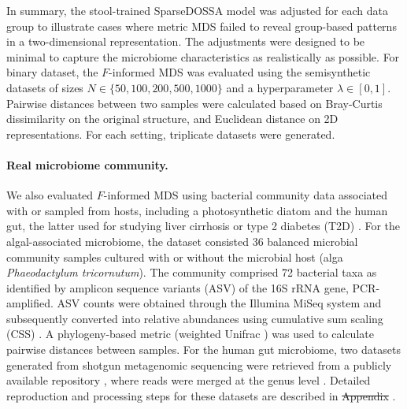 \documentclass[10pt,letterpaper]{article}
\newcommand{\1}{{\rm 1}\kern-0.24em{\rm I}}
\providecommand{\DIFaddtex}[1]{{\protect\color{blue}\uwave{#1}}} %
\providecommand{\DIFdeltex}[1]{{\protect\color{red}\sout{#1}}}                      %
\providecommand{\DIFaddbegin}{} %
\providecommand{\DIFaddend}{} %
\providecommand{\DIFdelbegin}{} %
\providecommand{\DIFdelend}{} %
\providecommand{\DIFadd}[1]{\texorpdfstring{\DIFaddtex{#1}}{#1}} %
\providecommand{\DIFdel}[1]{\texorpdfstring{\DIFdeltex{#1}}{}} %
\newcommand{\DIFscaledelfig}{0.5}
\newlength{\DIFdelgraphicswidth} %
\newlength{\DIFdelgraphicsheight} %
\newcommand{\DIFaddincludegraphics}[2][]{{\color{blue}\fbox{\DIFOincludegraphics[#1]{#2}}}} %
\newcommand{\DIFdelincludegraphics}[2][]{%
\sbox{\DIFdelgraphicsbox}{\DIFOincludegraphics[#1]{#2}}%
\settoboxwidth{\DIFdelgraphicswidth}{\DIFdelgraphicsbox} %
\settoboxtotalheight{\DIFdelgraphicsheight}{\DIFdelgraphicsbox} %
\scalebox{\DIFscaledelfig}{%
\parbox[b]{\DIFdelgraphicswidth}{\usebox{\DIFdelgraphicsbox}\\[-\baselineskip] \rule{\DIFdelgraphicswidth}{0em}}\llap{\resizebox{\DIFdelgraphicswidth}{\DIFdelgraphicsheight}{%
\setlength{\unitlength}{\DIFdelgraphicswidth}%
\begin{picture}(1,1)%
\thicklines\linethickness{2pt} %
{\color[rgb]{1,0,0}\put(0,0){\framebox(1,1){}}}%
{\color[rgb]{1,0,0}\put(0,0){\line( 1,1){1}}}%
{\color[rgb]{1,0,0}\put(0,1){\line(1,-1){1}}}%
\end{picture}%
}\hspace*{3pt}}} %
} %
\DeclareRobustCommand{\DIFaddbegin}{\DIFOaddbegin \let\includegraphics\DIFaddincludegraphics} %
\DeclareRobustCommand{\DIFaddend}{\DIFOaddend \let\includegraphics\DIFOincludegraphics} %
\DeclareRobustCommand{\DIFdelbegin}{\DIFOdelbegin \let\includegraphics\DIFdelincludegraphics} %
\DeclareRobustCommand{\DIFdelend}{\DIFOaddend \let\includegraphics\DIFOincludegraphics} %
\begin{document}
In summary, the stool-trained SparseDOSSA model was adjusted for each data group to illustrate cases where metric MDS failed to reveal group-based patterns in a two-dimensional representation. The adjustments were designed to be minimal to capture the microbiome characteristics as realistically as possible. For binary dataset, the $F$-informed MDS was evaluated using the semisynthetic datasets of sizes $N\in\{50,100,200,500,1000\}$ and a hyperparameter $\lambda\in[0, 1]$. Pairwise distances between two samples were calculated based on Bray-Curtis dissimilarity on the original structure, and Euclidean distance on 2D representations. For each setting, triplicate datasets were generated.

\paragraph*{Real microbiome community.}
We also evaluated $F$-informed MDS using bacterial community data associated with or sampled from hosts, including a photosynthetic diatom \cite{kim22} and the human gut, the latter used for studying liver cirrhosis \cite{Qin14} or type 2 diabetes (T2D) \cite{Karlsson13, Qin12}. 
For the algal-associated microbiome, the dataset consisted 36 balanced microbial community samples cultured with or without the microbial host (alga \textit{Phaeodactylum tricornutum}). The community comprised 72 bacterial taxa as identified by amplicon sequence variants (ASV) of the 16S rRNA gene, PCR-amplified. ASV counts were obtained through the Illumina MiSeq system and subsequently converted into relative abundances using cumulative sum scaling (CSS) \cite{paulson13}. A phylogeny-based metric (weighted Unifrac \cite{lozupone07}) was used to calculate pairwise distances between samples.
For the human gut microbiome, two datasets generated from shotgun metagenomic sequencing were retrieved from a publicly available repository \cite{Pasolli16}, where reads were merged at the genus level \cite{reiman20}. Detailed reproduction and processing steps for these datasets are described in \DIFdelbegin %
\DIFdel{Appendix }\DIFdelend \DIFaddbegin \DIFadd{Appendix D, } \DIFadd{File}\DIFaddend .
\end{document}
